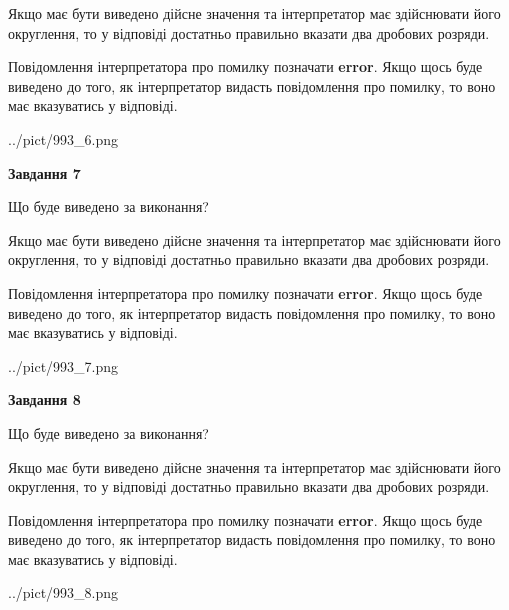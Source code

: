 \documentclass[12pt, ukrainian]{article}
\begin{document}
{\begin {Large}
Якщо має бути виведено дійсне значення та інтерпретатор має здійснювати його округлення, 
то у відповіді достатньо правильно вказати два дробових розряди.

Повідомлення інтерпретатора про помилку позначати \textbf{error}.
Якщо щось буде виведено до того, як інтерпретатор видасть повідомлення про помилку, 
то воно має вказуватись у відповіді. \par

\begin{center}
	{../pict/993_6.png}
\end{center}
\newpage

{\begin {center}\textbf{Завдання 7}\end {center}}\par
Що буде виведено за виконання? \par

Якщо має бути виведено дійсне значення та інтерпретатор має здійснювати його округлення, 
то у відповіді достатньо правильно вказати два дробових розряди.

Повідомлення інтерпретатора про помилку позначати \textbf{error}.
Якщо щось буде виведено до того, як інтерпретатор видасть повідомлення про помилку, 
то воно має вказуватись у відповіді. \par

\begin{center}
	{../pict/993_7.png}
\end{center}
\newpage

{\begin {center}\textbf{Завдання 8}\end {center}}\par
Що буде виведено за виконання? \par

Якщо має бути виведено дійсне значення та інтерпретатор має здійснювати його округлення, 
то у відповіді достатньо правильно вказати два дробових розряди.

Повідомлення інтерпретатора про помилку позначати \textbf{error}.
Якщо щось буде виведено до того, як інтерпретатор видасть повідомлення про помилку, 
то воно має вказуватись у відповіді. \par

\begin{center}
	{../pict/993_8.png}
\end{center}
\newpage


\end{Large}}
\end{document}
